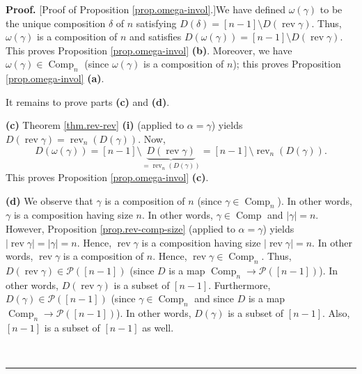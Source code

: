 \documentclass[numbers=enddot,12pt,final,onecolumn,notitlepage]{scrartcl}%
\theoremstyle{definition}
\newenvironment{proof}[1][Proof]{\noindent\textbf{#1.} }{\ \rule{0.5em}{0.5em}}
\begin{document}
\begin{proof}
[Proof of Proposition \ref{prop.omega-invol}.]We have defined $\omega\left(
\gamma\right)  $ to be the unique composition $\delta$ of $n$ satisfying
$D\left(  \delta\right)  =\left[  n-1\right]  \setminus D\left(
\operatorname*{rev}\gamma\right)  $. Thus, $\omega\left(  \gamma\right)  $ is
a composition of $n$ and satisfies $D\left(  \omega\left(  \gamma\right)
\right)  =\left[  n-1\right]  \setminus D\left(  \operatorname*{rev}%
\gamma\right)  $. This proves Proposition \ref{prop.omega-invol} \textbf{(b)}.
Moreover, we have $\omega\left(  \gamma\right)  \in\operatorname*{Comp}%
\nolimits_{n}$ (since $\omega\left(  \gamma\right)  $ is a composition of
$n$); this proves Proposition \ref{prop.omega-invol} \textbf{(a)}.

It remains to prove parts \textbf{(c)} and \textbf{(d)}. \medskip

\textbf{(c)} Theorem \ref{thm.rev-rev} \textbf{(i)} (applied to $\alpha
=\gamma$) yields $D\left(  \operatorname*{rev}\gamma\right)
=\operatorname*{rev}\nolimits_{n}\left(  D\left(  \gamma\right)  \right)  $.
Now,%
\[
D\left(  \omega\left(  \gamma\right)  \right)  =\left[  n-1\right]
\setminus\underbrace{D\left(  \operatorname*{rev}\gamma\right)  }%
_{=\operatorname*{rev}\nolimits_{n}\left(  D\left(  \gamma\right)  \right)
}=\left[  n-1\right]  \setminus\operatorname*{rev}\nolimits_{n}\left(
D\left(  \gamma\right)  \right)  .
\]
This proves Proposition \ref{prop.omega-invol} \textbf{(c)}. \medskip

\textbf{(d)} We observe that $\gamma$ is a composition of $n$ (since
$\gamma\in\operatorname*{Comp}\nolimits_{n}$). In other words, $\gamma$ is a
composition having size $n$. In other words, $\gamma\in\operatorname*{Comp}$
and $\left\vert \gamma\right\vert =n$. However, Proposition
\ref{prop.rev-comp-size} (applied to $\alpha=\gamma$) yields $\left\vert
\operatorname*{rev}\gamma\right\vert =\left\vert \gamma\right\vert =n$. Hence,
$\operatorname*{rev}\gamma$ is a composition having size $\left\vert
\operatorname*{rev}\gamma\right\vert =n$. In other words, $\operatorname*{rev}%
\gamma$ is a composition of $n$. Hence, $\operatorname*{rev}\gamma
\in\operatorname*{Comp}\nolimits_{n}$. Thus, $D\left(  \operatorname*{rev}%
\gamma\right)  \in\mathcal{P}\left(  \left[  n-1\right]  \right)  $ (since $D$
is a map $\operatorname*{Comp}\nolimits_{n}\rightarrow\mathcal{P}\left(
\left[  n-1\right]  \right)  $). In other words, $D\left(  \operatorname*{rev}%
\gamma\right)  $ is a subset of $\left[  n-1\right]  $. Furthermore, $D\left(
\gamma\right)  \in\mathcal{P}\left(  \left[  n-1\right]  \right)  $ (since
$\gamma\in\operatorname*{Comp}\nolimits_{n}$ and since $D$ is a map
$\operatorname*{Comp}\nolimits_{n}\rightarrow\mathcal{P}\left(  \left[
n-1\right]  \right)  $). In other words, $D\left(  \gamma\right)  $ is a
subset of $\left[  n-1\right]  $. Also, $\left[  n-1\right]  $ is a subset of
$\left[  n-1\right]  $ as well.


\end{proof}
\end{document}
